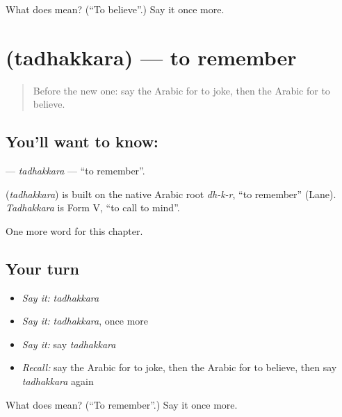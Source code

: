 \begin{tcolorbox}[breakable,colback=teal!4,colframe=teal!35!black,title={Before you move on}]
What does  mean? (\textquotedblleft{}To believe\textquotedblright{}.) Say it once more.
\end{tcolorbox}
\section[\texorpdfstring{\ar{تذكر} (tadhakkara)}{تذكر (tadhakkara)}]{ (tadhakkara) — to remember}

\label{lesson:AR-C164-tadhakkara}



\begin{quote}
Before the new one: say the Arabic for to joke, then the Arabic for to believe.
\end{quote}

\subsection*{You'll want to know: }
\textbf{} — \emph{tadhakkara} — \textquotedblleft{}to remember\textquotedblright{}.

\begin{cousinweb}
\textbf{} (\emph{tadhakkara}) is built on the native Arabic root \emph{dh-k-r}, \textquotedblleft{}to remember\textquotedblright{} (Lane). \emph{Tadhakkara} is Form V, \textquotedblleft{}to call to mind\textquotedblright{}.
\end{cousinweb}

\begin{grammarlens}[title={What you've built}]
One more word for this chapter.
\end{grammarlens}

\subsection*{Your turn}
\begin{itemize}
\raggedright
  \item \emph{Say it:} \emph{tadhakkara}
  \item \emph{Say it:} \emph{tadhakkara}, once more
  \item \emph{Say it:} say \emph{tadhakkara}
  \item \emph{Recall:} say the Arabic for to joke, then the Arabic for to believe, then say \emph{tadhakkara} again
\end{itemize}

\begin{tcolorbox}[breakable,colback=teal!4,colframe=teal!35!black,title={Before you move on}]
What does  mean? (\textquotedblleft{}To remember\textquotedblright{}.) Say it once more.
\end{tcolorbox}
